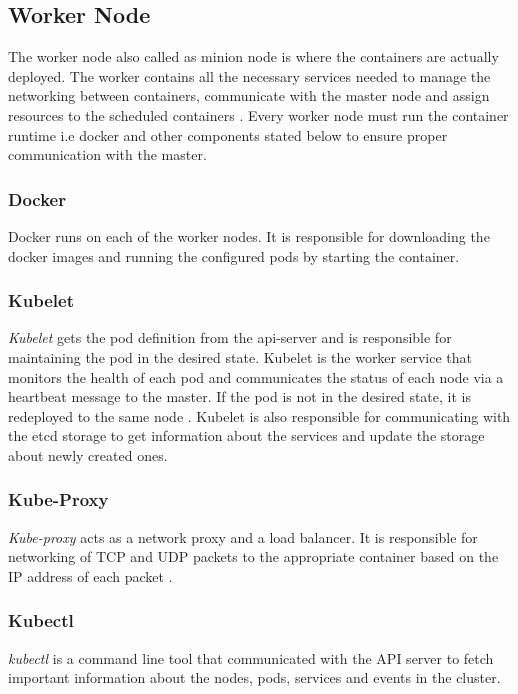 \documentclass[9pt,twocolumn,twoside]{../../styles/osajnl}
\begin{document}
\subsection{Worker Node}
The worker node also called as minion node is where the containers are
actually deployed. The worker contains all the necessary services
needed to manage the networking between containers, communicate with
the master node and assign resources to the scheduled containers
\cite{www-kubernetes-architecture}.  Every worker node must run the container runtime i.e docker
and other components stated below to ensure proper communication with
the master.

\subsubsection{Docker}
Docker runs on each of the worker nodes. It is responsible for
downloading the docker images and running the configured pods by
starting the container.

\subsubsection{Kubelet}
\emph{Kubelet} gets the pod definition from the api-server and is
responsible for maintaining the pod in the desired state. Kubelet is
the worker service that monitors the health of each pod and
communicates the status of each node via a heartbeat message to the
master.  If the pod is not in the desired state, it is redeployed to
the same node \cite{www-wiki-kubernetes}. Kubelet is also responsible for communicating
with the etcd storage to get information about the services and update
the storage about newly created ones.

\subsubsection{Kube-Proxy}
\emph{Kube-proxy} acts as a network proxy and a load balancer. It is
responsible for networking of TCP and UDP packets to the appropriate
container based on the IP address of each packet
\cite{www-wiki-kubernetes} \cite{www-kubernetes-architecture}.

\subsubsection{Kubectl}
\emph{kubectl} is a command line tool that communicated with the API
server to fetch important information about the nodes, pods, services
and events in the cluster.
\end{document}
